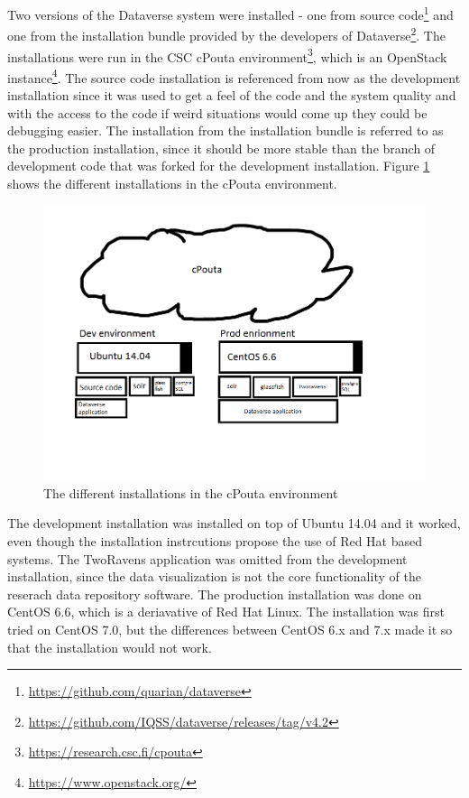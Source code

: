 Two versions of the Dataverse system were installed - one from source
code\footnote{\url{https://github.com/quarian/dataverse}} and one from the
installation bundle provided by the developers of
Dataverse\footnote{\url{https://github.com/IQSS/dataverse/releases/tag/v4.2}}.
The installations were run in the CSC cPouta
environment\footnote{\url{https://research.csc.fi/cpouta}}, which is an
OpenStack instance\footnote{\url{https://www.openstack.org/}}. The source code
installation is referenced from now as the development installation since it
was used to get a feel of the code and the system quality and with the access
to the code if weird situations would come up they could be debugging easier.
The installation from the installation bundle is referred to as the production
installation, since it should be more stable than the branch of development
code that was forked for the development installation. Figure
\ref{fig:cpouta} shows the different installations in the cPouta environment.

\begin{figure}
    \begin{centering}
        \includegraphics[width=\textwidth]{images/cpouta}
    \end{centering}
    \caption{The different installations in the cPouta environment}
    \label{fig:cpouta}
\end{figure}

The development installation was installed on top of Ubuntu 14.04 and it
worked, even though the installation instrcutions propose the use of Red Hat
based systems. The TwoRavens application was omitted from the development
installation, since the data visualization is not the core functionality of
the reserach data repository software. The production installation was done
on CentOS 6.6, which is a deriavative of Red Hat Linux. The installation was
first tried on CentOS 7.0, but the differences between CentOS 6.x and 7.x made
it so that the installation would not work.

